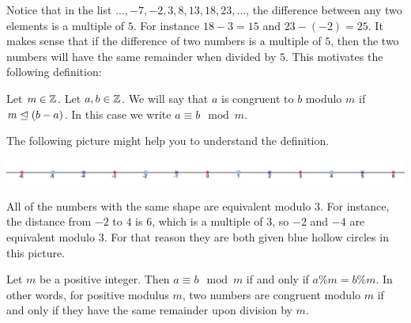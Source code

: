 Notice that in the list $..., -7, -2, 3, 8, 13, 18, 23, ...$, the difference between any two elements is a multiple of $5$.  For instance $18-3 = 15$ and $23 - (-2) = 25$.  It makes sense that if the difference of two numbers is a multiple of $5$, then the two numbers will have the same remainder when divided by $5$.  This motivates the following definition:

\begin{definition}
		Let $m \in \mathbb{Z}$.  Let $a,b\in \mathbb{Z}$.  We will say that $a$ is congruent to $b$ modulo $m$ if  $m \trianglelefteq (b-a)$.	 In this case we write $a \equiv b \mod m$.
\end{definition}

The following picture might help you to understand the definition.  

\includegraphics[scale=0.35]{mod3}

All of the numbers with the same shape are equivalent modulo $3$.  For instance, the distance from $-2$ to $4$ is $6$, which is a multiple of $3$, so $-2$ and $-4$ are equivalent modulo $3$.  For that reason they are both given blue hollow circles in this picture.
 
\begin{theorem}
Let $m$ be a positive integer.  Then $a \equiv b \mod m$ if and only if $a \% m = b \% m$.  In other words, for positive modulus $m$, two numbers are congruent modulo $m$ if and only if they have the same remainder upon division by $m$.  
\end{theorem}


